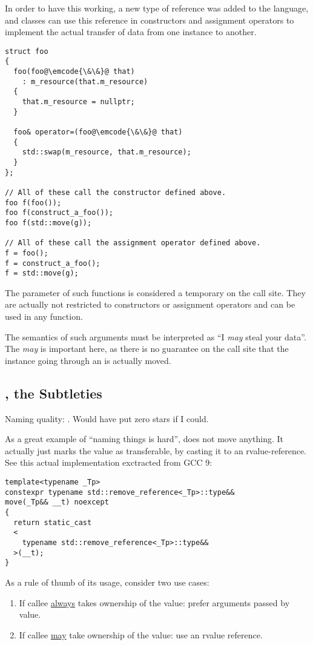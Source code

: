 In order to have this working, a new type of reference was added to
the language, and classes can use this reference in constructors and
assignment operators to implement the actual transfer of data from one
instance to another.

\begin{lstlisting}
struct foo
{
  foo(foo@\emcode{\&\&}@ that)
    : m_resource(that.m_resource)
  {
    that.m_resource = nullptr;
  }

  foo& operator=(foo@\emcode{\&\&}@ that)
  {
    std::swap(m_resource, that.m_resource);
  }
};

// All of these call the constructor defined above.
foo f(foo());
foo f(construct_a_foo());
foo f(std::move(g));

// All of these call the assignment operator defined above.
f = foo();
f = construct_a_foo();
f = std::move(g);
\end{lstlisting}

The parameter of such functions is considered a temporary on the call
site. They are actually not restricted to constructors or assignment
operators and can be used in any function.

The semantics of such arguments must be interpreted as ``I {\em may}
steal your data''. The {\em may} is important here, as there is no
guarantee on the call site that the instance going through an
 is actually moved.

\subsection{, the Subtleties}

Naming quality: \faStar\faStarO\faStarO\faStarO\faStarO. Would have
put zero stars if I could.

As a great example of ``naming things is hard'',  does
not move anything. It actually just marks the value as transferable,
by casting it to an rvalue-reference. See this actual implementation
exctracted from GCC 9:

\begin{lstlisting}
template<typename _Tp>
constexpr typename std::remove_reference<_Tp>::type&&
move(_Tp&& __t) noexcept
{
  return static_cast
  <
    typename std::remove_reference<_Tp>::type&&
  >(__t);
}
\end{lstlisting}

\begin{guideline}
  As a rule of thumb of its usage, consider two use cases:

  \begin{enumerate}
  \item If callee \underline{always} takes ownership of the value:
    prefer arguments passed by value.
  \item If callee \underline{may} take ownership of the value: use an
    rvalue reference.
  \end{enumerate}
\end{guideline}

